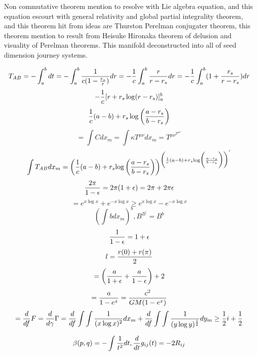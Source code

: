 \documentclass{jsarticle}
\begin{document}
   Non commutative theorem mention to resolve with Lie algebra equation,
   and this equation escourt with general relativity and global partial
   integrality theorem, and this theorem hit from ideas are 
   Thurston Perelman conjugater theorem, this theorem mention to
   result from Heisuke Hironaka theorem of delusion and visuality of Perelman
   theorems.
   This manifold deconstructed into all of seed dimension journey systems.
   
   $$ T_{AB} = - \int^b_a dt = -\int^b_a{1 \over {c(1 - {r_s \over r})}}dr
   = - {1 \over c}\int^b_a{r \over {r - r_s}}dr = - {1 \over c}
   \int^b_a(1 + {r_s \over {r - r_s}})dr $$
   $$ -{1 \over c}[r + r_s \log(r - r_s)]^b_a $$
   $$ {1 \over c}{(a - b) + r_s \log{\left({a - r_s} \over {b - r_s}\right)}} $$
   $$ = \int C dx_m = \int \kappa T^{\mu\nu}dx_m = 
   {T^{{\mu\nu}^{{{T^{\mu\nu}}}^{'}}}} $$
   $$ \int T_{AB}dx_m = \biggl({{1 \over c}
   {(a - b) + r_s {\log{\biggl({{a - r_s}
   \over {b - r_s}}}\biggl)}\biggl)}{^{{\biggl({1 \over c}{(a - b) + 
   r_s {\log \biggl({{a - r_s}
   \over {b - r_s}}\biggl)}\biggl)}^{'}}}}} $$
   $$ {2\pi \over {1 - \epsilon}} = 2\pi(1 + \epsilon) = 2\pi + 2\pi \epsilon $$
   $$ = e^{x \log x} + e^{-x \log x} \ge e^{x \log x} - e^{-x \log x} $$
   $$ (\int b dx_m)^{b}, B^{B^{'}} = B^{b} $$
   $$ {1 \over {1 - \epsilon}} = 1 + \epsilon $$
   $$ l = {{r(0) + r(\pi)} \over 2} $$
   $$ = \left({a \over {1 + \epsilon}} + {a \over {1 - \epsilon}}\right) + 2 $$
   $$ = {a \over {1 - e^{x}}} = {c^2 \over {GM(1 - e^{x})}} $$
   $$  = {d \over {d f}}F = {d \over {d \gamma}}\Gamma
   = {d \over {d f}}\int\int{1 \over {(x \log x)^2}}dx_m
   + {d \over {d f}}\int\int{1 \over {(y \log y)^{1 \over 2}}}dy_m
   \ge {1 \over 2}i + {1 \over 2}  $$

   $$ \beta(p,q) = - \int {1 \over t^2}dt, {d \over dt}g_{ij}(t) = - 2 R_{ij} $$
\end{document}
